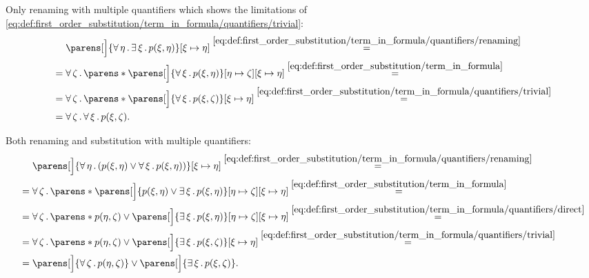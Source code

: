 \begin{example}
\begin{thmenum}
     Only renaming with multiple quantifiers which shows the limitations of \eqref{eq:def:first_order_substitution/term_in_formula/quantifiers/trivial}:
    \begin{align*}
      &\phantom{{}={}}
      \parens[\Big]{\qforall \eta \qexists \xi p(\xi, \eta)}[\xi \mapsto \eta]
      \overset {\eqref{eq:def:first_order_substitution/term_in_formula/quantifiers/renaming}} = \\ &=
      \qforall \zeta \parens*{ \parens[\Big]{ \qforall \xi p(\xi, \eta) }[\eta \mapsto \zeta][\xi \mapsto \eta]}
      \overset {\eqref{eq:def:first_order_substitution/term_in_formula}} = \\ &=
      \qforall \zeta \parens*{ \parens[\Big]{ \qforall \xi p(\xi, \zeta) }[\xi \mapsto \eta]}
      \overset {\eqref{eq:def:first_order_substitution/term_in_formula/quantifiers/trivial}} = \\ &=
      \qforall \zeta \qforall \xi p(\xi, \zeta).
    \end{align*}

     Both renaming and substitution with multiple quantifiers:
    \begin{align*}
      &\phantom{{}={}}
      \parens[\Big]{ \qforall \eta (p(\xi, \eta) \vee \qforall \xi p(\xi, \eta)) }[\xi \mapsto \eta]
      \overset {\eqref{eq:def:first_order_substitution/term_in_formula/quantifiers/renaming}} = \\ &=
      \qforall \zeta \parens*{ \parens[\Big]{ p(\xi, \eta) \vee \qexists \xi p(\xi, \eta) }[\eta \mapsto \zeta][\xi \mapsto \eta] }
      \overset {\eqref{eq:def:first_order_substitution/term_in_formula}} = \\ &=
      \qforall \zeta \parens*{ p(\eta, \zeta) \vee \parens[\Big]{ \qexists \xi p(\xi, \eta) }[\eta \mapsto \zeta][\xi \mapsto \eta] }
      \overset {\eqref{eq:def:first_order_substitution/term_in_formula/quantifiers/direct}} = \\ &=
      \qforall \zeta \parens*{ p(\eta, \zeta) \vee \parens[\Big]{ \qexists \xi p(\xi, \zeta) }[\xi \mapsto \eta] }
      \overset {\eqref{eq:def:first_order_substitution/term_in_formula/quantifiers/trivial}} = \\ &=
      \parens[\Big]{ \qforall \zeta p(\eta, \zeta) } \vee \parens[\Big]{ \qexists \xi p(\xi, \zeta) }.
    \end{align*}


\end{thmenum}
\end{example}

